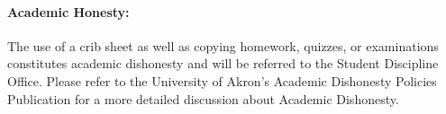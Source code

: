 \paragraph{Academic Honesty:  }
The use of a crib sheet as well as copying homework, quizzes, or 
examinations constitutes academic dishonesty and will be referred to 
the Student Discipline Office.  
Please refer to the University of Akron’s Academic Dishonesty Policies 
Publication for a more detailed discussion about Academic Dishonesty.








